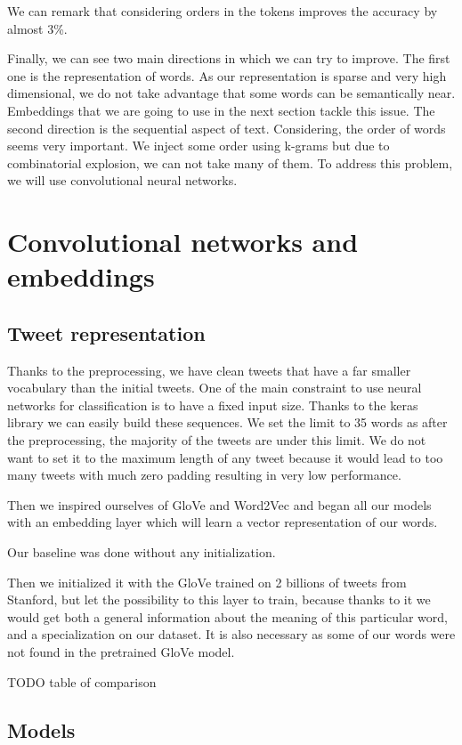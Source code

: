 \documentclass[10pt,conference,compsocconf]{IEEEtran}
\begin{document}
We can remark that considering orders in the tokens improves the accuracy by almost 3\%.

Finally, we can see two main directions in which we can try to improve. The first one is the representation of words. As our representation is sparse and very high dimensional, we do not take advantage that some words can be semantically near. Embeddings that we are going to use in the next section tackle this issue. The second direction is the sequential aspect of text. Considering, the order of words seems very important. We inject some order using k-grams but due to combinatorial explosion, we can not take many of them. To address this problem, we will use convolutional neural networks.

\section{Convolutional networks and embeddings}

\subsection{Tweet representation}

Thanks to the preprocessing, we have clean tweets that have a far smaller vocabulary than the initial tweets. One of the main constraint to use neural networks for classification is to have a fixed input size. Thanks to the keras library we can easily build these sequences. We set the limit to 35 words as after the preprocessing, the majority of the tweets are under this limit. We do not want to set it to the maximum length of any tweet because it would lead to too many tweets with much zero padding resulting in very low performance.

Then we inspired ourselves of GloVe and Word2Vec and began all our models with an embedding layer which will learn a vector representation of our words.

Our baseline was done without any initialization.

Then we initialized it with the GloVe trained on 2 billions of tweets from Stanford, but let the possibility to this layer to train, because thanks to it we would get both a general information about the meaning of this particular word, and a specialization on our dataset. It is also necessary as some of our words were not found in the pretrained GloVe model.

TODO table of comparison

\subsection{Models}
\end{document}
